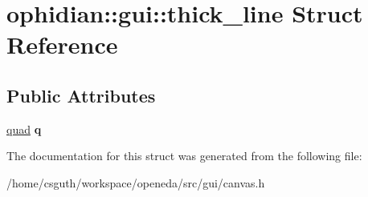 \hypertarget{structophidian_1_1gui_1_1thick__line}{\section{ophidian\-:\-:gui\-:\-:thick\-\_\-line Struct Reference}
\label{structophidian_1_1gui_1_1thick__line}
}
\subsection*{Public Attributes}
\begin{DoxyCompactItemize}
\item 
\hypertarget{structophidian_1_1gui_1_1thick__line_a87db8909edfbbaf692c9f5b49e7c39ef}{\hyperlink{structophidian_1_1gui_1_1quad}{quad} {\bfseries q}}\label{structophidian_1_1gui_1_1thick__line_a87db8909edfbbaf692c9f5b49e7c39ef}

\end{DoxyCompactItemize}


The documentation for this struct was generated from the following file\-:\begin{DoxyCompactItemize}
\item 
/home/csguth/workspace/openeda/src/gui/canvas.\-h\end{DoxyCompactItemize}
